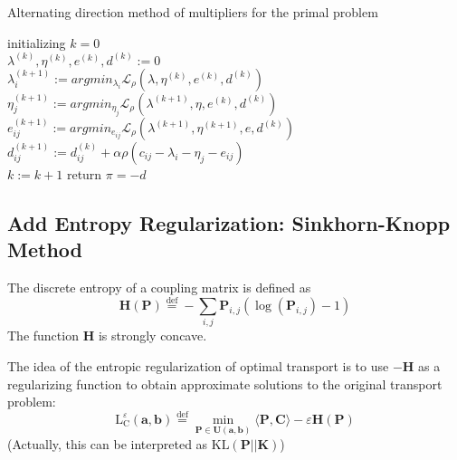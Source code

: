 \documentclass{article}
\begin{document}
\begin{algorithm}[H]
  \SetAlgoNoLine
  \caption{Alternating direction method of multipliers for the primal problem} 
  initializing $k = 0$\\
  $\lambda^{(k)},\eta^{(k)},e^{(k)},d^{(k)}:=0$\\
  {  
   $\lambda^{(k+1)}_{i}:=argmin_{\lambda_{i}}\mathcal{L}_{\rho}(\lambda,\eta^{(k)},e^{(k)},d^{(k)})$\\
   $\eta^{(k+1)}_{j}:=argmin_{\eta_{j}}\mathcal{L}_{\rho}(\lambda^{(k+1)},\eta,e^{(k)},d^{(k)})$\\
   $e^{(k+1)}_{ij}:=argmin_{e_{ij}}\mathcal{L}_{\rho}(\lambda^{(k+1)},\eta^{(k+1)},e,d^{(k)})$\\
   $d^{(k+1)}_{ij}:=d^{(k)}_{ij}+\alpha\rho(c_{ij}-\lambda_{i}-\eta_{j}-e_{ij})$\\
   $k:= k+1$
  }
  return $\pi=-d$
\end{algorithm}
\subsection{Add Entropy Regularization: Sinkhorn-Knopp Method }
The discrete entropy of a coupling matrix is defined as
\begin{equation}
\mathbf { H } ( \mathbf { P } ) \stackrel { \mathrm { def } } { = } - \sum _ { i , j } \mathbf { P } _ { i , j } \left( \log \left( \mathbf { P } _ { i , j } \right) - 1 \right)
\end{equation}
The function $\mathbf{H}$ is strongly concave.

The idea of the entropic regularization of optimal transport is to use $-\mathbf{H}$ as a regularizing function to obtain approximate solutions to the original transport problem:
\begin{equation}
\mathrm { L } _ { \mathrm { C } } ^ { \varepsilon } ( \mathbf { a } , \mathbf { b } ) \stackrel { \mathrm { def } } { = } \min _ { \mathbf { P } \in \mathbf { U } ( \mathbf { a } , \mathbf { b } ) } \langle \mathbf { P } , \mathbf { C } \rangle - \varepsilon \mathbf { H } ( \mathbf { P } )
\label{sinkhorn target}
\end{equation}
(Actually, this can be interpreted as $\text{KL}(\mathbf{P}||\mathbf{K})$)
\end{document}
